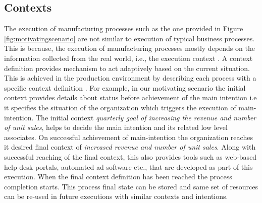 \subsection{Contexts} 
\label{sec:contexts}
The execution of manufacturing processes such as the one provided in Figure \ref{fig:motivatingscenario} are not similar to execution of typical business processes. This is because, the execution of manufacturing processes mostly depends on the information collected from the real world, i.e., the execution context \cite{Sungur2016}. A context definition provides mechanism to act adaptively based on the current situation. This is achieved in the production environment by describing each process with a specific context definition \cite{Sungur2016}. For example, in our motivating scenario the initial context provides details about status before achievement of the main intention i.e it specifies the situation of the organization which triggers the execution of main-intention. The initial context \textit{quarterly goal of increasing the revenue and number of unit sales}, helps to decide the main intention and its related low level associates. On successful achievement of main-intention the organization reaches it desired final context of \textit{increased revenue and number of unit sales}. Along with successful reaching of the final context, this also provides tools such as web-based help desk portals, automated ad software etc., that are developed as part of this execution. When the final context definition has been reached the process completion starts. This process final state can be stored \cite{Sungur2015} and same set of resources can be re-used in future executions with similar contexts and intentions.
 
